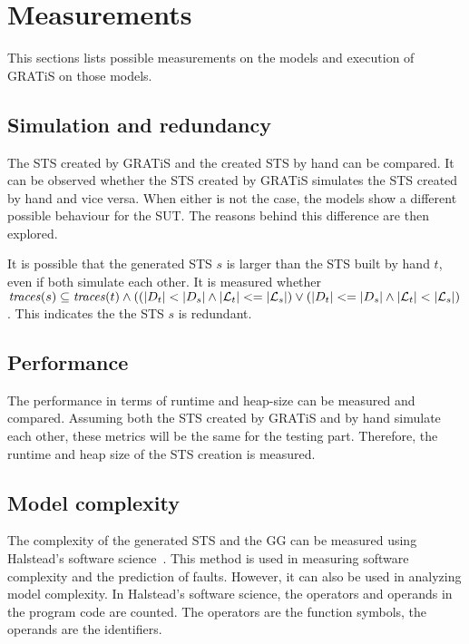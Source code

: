 \section{Measurements}\label{sec:measurements}

This sections lists possible measurements on the models and execution of GRATiS on those models.

\subsection{Simulation and redundancy}
The STS created by GRATiS and the created STS by hand can be compared. It can be observed whether the STS created by GRATiS simulates the STS created by hand and vice versa. When either is not the case, the models show a different possible behaviour for the SUT. The reasons behind this difference are then explored. 

It is possible that the generated STS $s$ is larger than the STS built by hand $t$, even if both simulate each other. It is measured whether $\mathit{traces}(s) \subseteq \mathit{traces}(t) \land ((|D_t| < |D_s| \land |\mathcal{L}_t| <= |\mathcal{L}_s|) \lor (|D_t| <= |D_s| \land |\mathcal{L}_t| < |\mathcal{L}_s|)$. This indicates the the STS $s$ is redundant.

\subsection{Performance}
The performance in terms of runtime and heap-size can be measured and compared. Assuming both the STS created by GRATiS and by hand simulate each other, these metrics will be the same for the testing part. Therefore, the runtime and heap size of the STS creation is measured.

\subsection{Model complexity}\label{sec:complexity_measurement}
The complexity of the generated STS and the GG can be measured using Halstead's software science~\cite{Halstead:software-science}. This method is used in measuring software complexity and the prediction of faults. However, it can also be used in analyzing model complexity. In Halstead's software science, the operators and operands in the program code are counted. The operators are the function symbols, the operands are the identifiers. 

